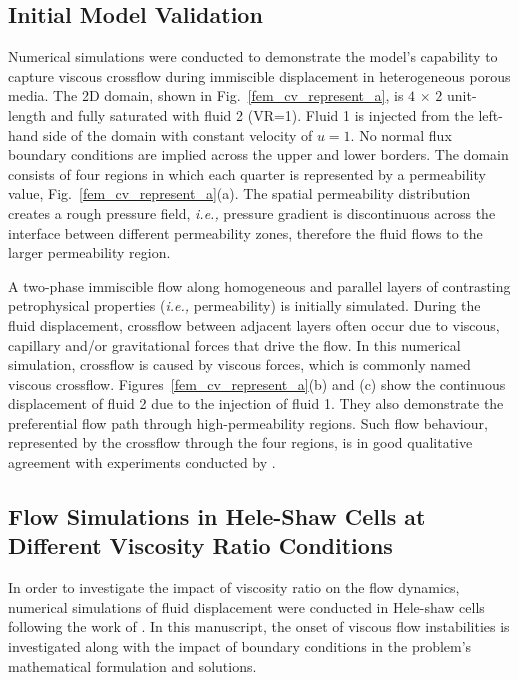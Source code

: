 \documentclass[preprint,authoryear,12pt]{elsarticle}
\newcommand{\ie}{{\it i.e., }}
\begin{document}
\subsection{Initial Model Validation}\label{section:results_initial_model_validation}
Numerical simulations \citep[based on lab experiments due to][]{evans_1994,dawe_2008} were conducted to demonstrate the model's capability to capture viscous crossflow during immiscible displacement in heterogeneous porous media. The 2D domain, shown in Fig.~\ref{fem_cv_represent_a}, is $4$ $\times$ $2$ unit-length and fully saturated with fluid 2 (VR=1). Fluid 1 is injected from the left-hand side of the domain with constant velocity of $u=1$. No normal flux boundary conditions are implied across the upper and lower borders. The domain consists of four regions in which each quarter is represented by a permeability value, Fig.~\ref{fem_cv_represent_a}(a). The spatial permeability distribution creates a rough pressure field, \ie pressure gradient is discontinuous across the interface between different permeability zones, therefore the fluid flows to the larger permeability region. %

\medskip
A two-phase immiscible flow along homogeneous and parallel layers of contrasting petrophysical properties (\ie permeability) is initially simulated. During the fluid displacement, crossflow between adjacent layers often occur due to viscous, capillary and/or gravitational forces that drive the flow. In this numerical simulation, crossflow is caused by viscous forces, which is commonly named viscous crossflow. Figures~\ref{fem_cv_represent_a}(b) and (c) show the continuous displacement of fluid 2 due to the injection of fluid 1. They also demonstrate the preferential flow path through high-permeability regions. Such flow behaviour, represented by the crossflow through the four regions, is in good qualitative agreement with experiments conducted by \citet{dawe_2008}. 


\subsection{Flow Simulations in Hele-Shaw Cells at Different Viscosity Ratio Conditions}\label{section:results_homo_hete} 
In order to investigate the impact of viscosity ratio on the flow dynamics, numerical simulations of fluid displacement were conducted in Hele-shaw cells following the work of \citet{saffman_1986}. In this manuscript, the onset of viscous flow instabilities \citep[following his seminal work in][]{saffman_1958} is investigated along with the impact of boundary conditions in the problem's mathematical formulation and solutions. 
\end{document}
